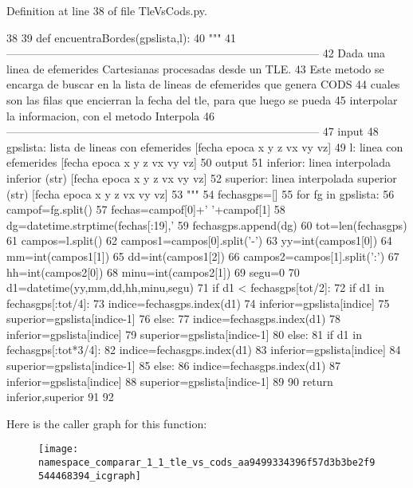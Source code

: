 \-Definition at line 38 of file \-Tle\-Vs\-Cods.\-py.


\begin{DoxyCode}
38 
39 def encuentraBordes(gpslista,l):
40     """
41    
       ------------------------------------------------------------------------------------
42     Dada una linea de efemerides Cartesianas procesadas desde un TLE. 
43     Este metodo se encarga de buscar en la lista de lineas de efemerides que
       genera CODS
44     cuales son las filas que encierran  la fecha del tle, para que luego se
       pueda
45     interpolar la informacion, con el metodo Interpola
46    
       ------------------------------------------------------------------------------------
47     input
48         gpslista: lista de lineas con efemerides [fecha epoca x y z vx vy vz]
49         l: linea con efemerides [fecha epoca x y z vx vy vz]
50     output
51         inferior: linea interpolada inferior (str) [fecha epoca x y z vx vy vz]
52         superior: linea interpolada superior (str) [fecha epoca x y z vx vy vz]
53     """
54     fechasgps=[]
55     for fg in gpslista:
56         campof=fg.split()
57         fechas=campof[0]+' '+campof[1]
58         dg=datetime.strptime(fechas[:19],'%
59         fechasgps.append(dg)
60     tot=len(fechasgps)
61     campos=l.split()
62     campos1=campos[0].split('-')
63     yy=int(campos1[0])
64     mm=int(campos1[1])
65     dd=int(campos1[2])
66     campos2=campos[1].split(':')
67     hh=int(campos2[0])
68     minu=int(campos2[1])
69     segu=0
70     d1=datetime(yy,mm,dd,hh,minu,segu)      
71     if d1 < fechasgps[tot/2]:
72         if d1 in fechasgps[:tot/4]:
73             indice=fechasgps.index(d1)
74             inferior=gpslista[indice]
75             superior=gpslista[indice-1]
76         else:
77             indice=fechasgps.index(d1)
78             inferior=gpslista[indice]
79             superior=gpslista[indice-1]
80     else:
81         if d1 in fechasgps[:tot*3/4]:
82             indice=fechasgps.index(d1)
83             inferior=gpslista[indice]
84             superior=gpslista[indice-1]
85         else:
86             indice=fechasgps.index(d1)
87             inferior=gpslista[indice]
88             superior=gpslista[indice-1]
89                 
90     return inferior,superior
91              
92 

\end{DoxyCode}


\-Here is the caller graph for this function\-:\nopagebreak
\begin{figure}[H]
\begin{center}
\leavevmode
\texttt{[image: namespace\_comparar\_1\_1\_tle\_vs\_cods\_aa9499334396f57d3b3be2f9544468394\_icgraph]}
\end{center}
\end{figure}



